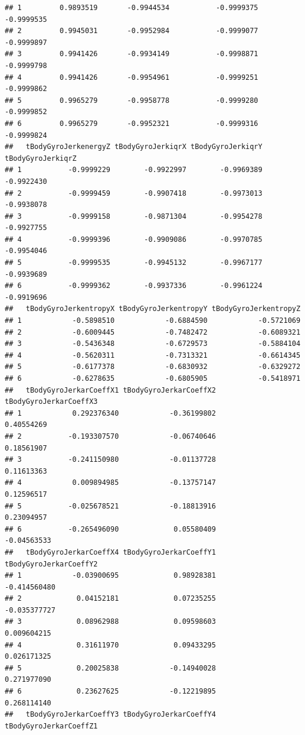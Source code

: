 \documentclass[
]{article}
\begin{document}
\begin{verbatim}
## 1         0.9893519       -0.9944534           -0.9999375           -0.9999535
## 2         0.9945031       -0.9952984           -0.9999077           -0.9999897
## 3         0.9941426       -0.9934149           -0.9998871           -0.9999798
## 4         0.9941426       -0.9954961           -0.9999251           -0.9999862
## 5         0.9965279       -0.9958778           -0.9999280           -0.9999852
## 6         0.9965279       -0.9952321           -0.9999316           -0.9999824
##   tBodyGyroJerkenergyZ tBodyGyroJerkiqrX tBodyGyroJerkiqrY tBodyGyroJerkiqrZ
## 1           -0.9999229        -0.9922997        -0.9969389        -0.9922430
## 2           -0.9999459        -0.9907418        -0.9973013        -0.9938078
## 3           -0.9999158        -0.9871304        -0.9954278        -0.9927755
## 4           -0.9999396        -0.9909086        -0.9970785        -0.9954046
## 5           -0.9999535        -0.9945132        -0.9967177        -0.9939689
## 6           -0.9999362        -0.9937336        -0.9961224        -0.9919696
##   tBodyGyroJerkentropyX tBodyGyroJerkentropyY tBodyGyroJerkentropyZ
## 1            -0.5898510            -0.6884590            -0.5721069
## 2            -0.6009445            -0.7482472            -0.6089321
## 3            -0.5436348            -0.6729573            -0.5884104
## 4            -0.5620311            -0.7313321            -0.6614345
## 5            -0.6177378            -0.6830932            -0.6329272
## 6            -0.6278635            -0.6805905            -0.5418971
##   tBodyGyroJerkarCoeffX1 tBodyGyroJerkarCoeffX2 tBodyGyroJerkarCoeffX3
## 1            0.292376340            -0.36199802             0.40554269
## 2           -0.193307570            -0.06740646             0.18561907
## 3           -0.241150980            -0.01137728             0.11613363
## 4            0.009894985            -0.13757147             0.12596517
## 5           -0.025678521            -0.18813916             0.23094957
## 6           -0.265496090             0.05580409            -0.04563533
##   tBodyGyroJerkarCoeffX4 tBodyGyroJerkarCoeffY1 tBodyGyroJerkarCoeffY2
## 1            -0.03900695             0.98928381           -0.414560480
## 2             0.04152181             0.07235255           -0.035377727
## 3             0.08962988             0.09598603            0.009604215
## 4             0.31611970             0.09433295            0.026171325
## 5             0.20025838            -0.14940028            0.271977090
## 6             0.23627625            -0.12219895            0.268114140
##   tBodyGyroJerkarCoeffY3 tBodyGyroJerkarCoeffY4 tBodyGyroJerkarCoeffZ1

\end{verbatim}
\end{document}
